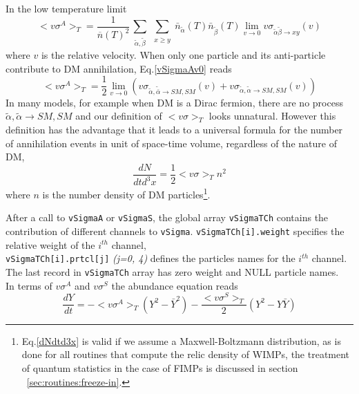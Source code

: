 \documentclass[12pt,a4paper]{article}
\begin{document}
  In the low temperature limit 
\begin{equation}
\label{vSigmaAv0}
<v\sigma^A>_T = \frac{1}{\overline{n}(T)^2}   
\sum_{\substack{
\tilde\alpha ,\tilde\beta }}  
\sum_{\substack{ x \ge y }} \bar{n}_{\tilde{\alpha}}(T) \bar{n}_{\tilde{\beta}}(T)  { \lim_{v \to 0}}  v\sigma_{\tilde\alpha\tilde\beta\to x y}(v)    
\end{equation} 
where $v$ is the relative velocity.  When only one  particle and its anti-particle  contribute to DM annihilation, Eq.\ref{vSigmaAv0} reads 
\begin{equation}
<v\sigma^A>_T =\frac{1}{2} \lim_{v\to 0} ( v \sigma_{\tilde{\alpha},\tilde{\bar{\alpha}} \to SM,SM }(v) + v \sigma_{\tilde{\alpha},\tilde{\alpha} \to SM,SM }(v)) 
\end{equation} 
In many models, for example when DM is a Dirac fermion,   there are no process $ \tilde{\alpha},\tilde{\alpha} \to SM,SM $ and our definition of $<v\sigma>_T $ looks   
unnatural. However this definition has the advantage that it  leads to a universal formula for the number of annihilation events in unit of space-time volume, regardless of the nature of DM, 
\begin{equation}
\label{dNdtd3x}  
  \frac{dN}{dt d^3x}= \frac{1}{2} <v\sigma>_T n^2 
\end{equation}
where $n$ is the number density of DM particles\footnote{ Eq.\ref{dNdtd3x} is valid if we assume a Maxwell-Boltzmann distribution, as is done  for all routines that compute the relic density of WIMPs, the treatment of   quantum statistics in the case of FIMPs is discussed in section ~\ref{sec:routines:freeze-in}.}.



After a call to {\tt vSigmaA} or {\tt vSigmaS}, the global array {\tt vSigmaTCh} contains the 
contribution of different channels to {\tt vSigma}. \verb|vSigmaTCh[i].weight| specifies the relative
weight of the $i^{th}$ channel, \\
\verb|vSigmaTCh[i].prtcl[j]|  {\it (j=0, 4)}  defines the particles names for the $i^{th}$
channel.\\
The last record in \verb|vSigmaTCh| array has zero weight and 
NULL particle names.\\

In terms of $v\sigma^A$ and $v\sigma^S$ the abundance equation 
reads
\begin{equation}
    \frac{dY}{dt}= -<v\sigma^A>_T ( Y^2 - \bar{Y}^2) - \frac{<v\sigma^S>_T}{2}( Y^2 - Y\bar{Y}) 
\end{equation}
\end{document}
